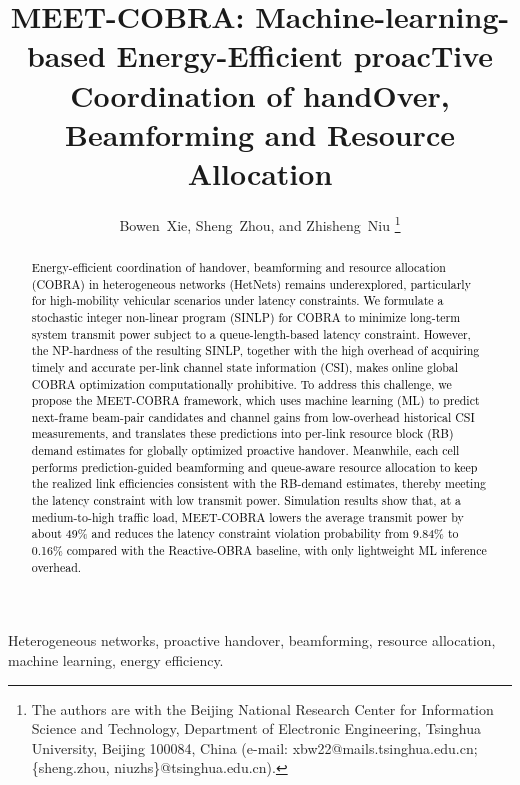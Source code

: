 \documentclass[10pt,journal,letterpaper]{IEEEtran}
\newcommand{\rev}[1]{\textcolor{revisioncolor}{{}#1}}
\newcommand{\omitted}[1]{}
\theoremstyle{remark}
\begin{document}
\title{MEET-COBRA: Machine-learning-based Energy-Efficient proacTive Coordination of handOver, Beamforming and Resource Allocation}


\author{Bowen~Xie, Sheng~Zhou, and Zhisheng~Niu%
\thanks{The authors are with the Beijing National Research Center for Information Science and Technology, Department of Electronic Engineering, Tsinghua University, Beijing 100084, China (e-mail: xbw22@mails.tsinghua.edu.cn; \{sheng.zhou, niuzhs\}@tsinghua.edu.cn).}
}

\maketitle

\begin{abstract}
\textcolor{black}{
Energy-efficient coordination of handover, beamforming and resource allocation (COBRA) in heterogeneous networks (HetNets) remains underexplored, particularly for high-mobility vehicular scenarios under latency constraints.
We formulate a stochastic integer non-linear program (SINLP) for COBRA to minimize long-term system transmit power subject to a queue-length-based latency constraint.
However, the NP-hardness of the resulting SINLP, together with the high overhead of acquiring timely and accurate per-link channel state information (CSI), makes online global COBRA optimization computationally prohibitive.
To address this challenge, we propose the MEET-COBRA framework, which uses machine learning (ML) to predict next-frame beam-pair candidates and channel gains from low-overhead historical CSI measurements, and translates these predictions into per-link resource block (RB) demand estimates for globally optimized proactive handover. 
Meanwhile, each cell performs prediction-guided beamforming and queue-aware resource allocation to keep the realized link efficiencies consistent with the RB-demand estimates, thereby meeting the latency constraint with low transmit power.
Simulation results show that, at a medium-to-high traffic load, MEET-COBRA lowers the average transmit power by about \omitted{}\rev{49\%} and reduces the latency constraint violation probability from \omitted{}\rev{9.84\% to 0.16\%} compared with the Reactive-OBRA baseline, with only lightweight ML inference overhead.
}
\end{abstract}


\begin{IEEEkeywords}
Heterogeneous networks, proactive handover, beamforming, resource allocation, machine learning, energy efficiency.
\end{IEEEkeywords}
\end{document}
